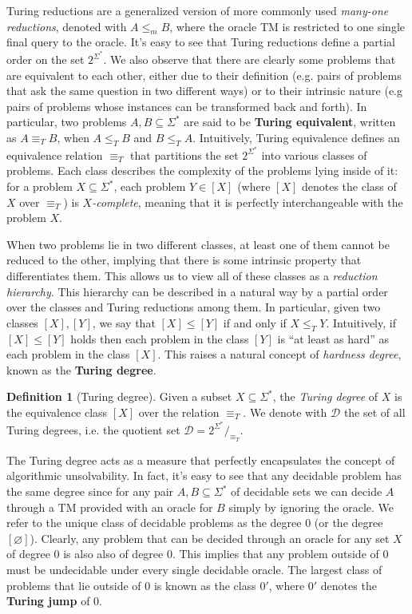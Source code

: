 \documentclass[12pt,a4paper]{article}
\theoremstyle{definition}
\newtheorem{definition}{Definition}
\newcommand{\curlyquotes}[1]{\textquotedblleft #1\textquotedblright}
\begin{document}
    Turing reductions are a generalized version of more commonly used \textit{many-one reductions}, denoted with $A \leq_m B$, where the oracle TM is restricted to one single final query to the oracle. It's easy to see that Turing reductions define a partial order on the set $2^{\Sigma^*}$. We also observe that there are clearly some problems that are equivalent to each other, either due to their definition (e.g. pairs of problems that ask the same question in two different ways) or to their intrinsic nature (e.g pairs of problems whose instances can be transformed back and forth). In particular, two problems $A,B \subseteq \Sigma^*$ are said to be \textbf{Turing equivalent}, written as $A \equiv_T B$, when $A \leq_T B$ and $B \leq_T A$. Intuitively, Turing equivalence defines an equivalence relation $\equiv_T$ that partitions the set $2^{\Sigma^*}$ into various classes of problems. Each class describes the complexity of the problems lying inside of it: for a problem $X \subseteq \Sigma^*$, each problem $Y \in [X]$ (where $[X]$ denotes the class of $X$ over $\equiv_T$) is \textit{$X$-complete}, meaning that it is perfectly interchangeable with the problem $X$.
    
    When two problems lie in two different classes, at least one of them cannot be reduced to the other, implying that there is some intrinsic property that differentiates them. This allows us to view all of these classes as a \textit{reduction hierarchy}. This hierarchy can be described in a natural way by a partial order over the classes and Turing reductions among them. In particular, given two classes $[X], [Y]$, we say that $[X] \leq [Y]$ if and only if $X \leq_T Y$. Intuitively, if $[X] \leq [Y]$ holds then each problem in the class $[Y]$ is \curlyquotes{at least as hard} as each problem in the class $[X]$. This raises a natural concept of \textit{hardness degree}, known as the \textbf{Turing degree}.

    \begin{definition}[Turing degree]
        Given a subset $X \subseteq \Sigma^*$, the \textit{Turing degree} of $X$ is the equivalence class $[X]$ over the relation $\equiv_T$. We denote with $\mathcal{D}$ the set of all Turing degrees, i.e. the quotient set $\mathcal{D} = 2^{\Sigma^*}/_{\equiv_T}$.
    \end{definition}

    The Turing degree acts as a measure that perfectly encapsulates the concept of algorithmic unsolvability. In fact, it's easy to see that any decidable problem has the same degree since for any pair $A,B \subseteq \Sigma^*$ of decidable sets we can decide $A$ through a TM provided with an oracle for $B$ simply by ignoring the oracle. We refer to the unique class of decidable problems as the degree $0$ (or the degree $[\varnothing]$). Clearly, any problem that can be decided through an oracle for any set $X$ of degree 0 is also also of degree 0. This implies that any problem outside of 0 must be undecidable under every single decidable oracle. The largest class of problems that lie outside of 0 is known as the class $0'$, where $0'$ denotes the \textbf{Turing jump} of 0. 
    
\end{document}
